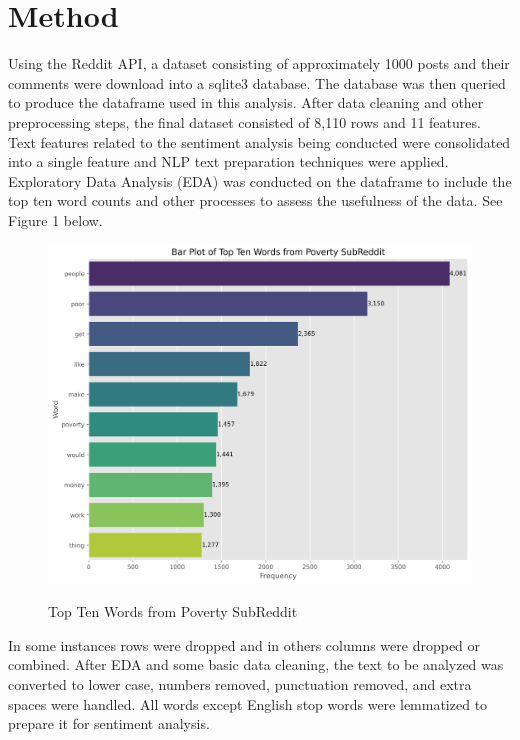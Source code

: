 \documentclass[stu,12pt,floatsintext]{apa7}
\begin{document}
\section{Method}
\indent Using the Reddit API, a dataset consisting of approximately 1000 posts and their comments were download into a sqlite3 database.  The database was then queried to produce the dataframe used in this analysis.  After data cleaning and other preprocessing steps, the final dataset consisted of 8,110 rows and 11 features.  Text features related to the sentiment analysis being conducted were consolidated into a single feature and NLP text preparation techniques were applied.  Exploratory Data Analysis (EDA) was conducted on the dataframe to include the top ten word counts and other processes to assess the usefulness of the data.  See Figure 1 below.
\begin{figure}[H]
	\centering
	\caption{Top Ten Words from Poverty SubReddit}
	\includegraphics[width=0.75\linewidth]{figures/barplotWordCount.png}
	\label{fig:word_counts}
\end{figure}
\indent In some instances rows were dropped and in others columns were dropped or combined.  After EDA and some basic data cleaning, the text to be analyzed  was converted to lower case, numbers removed, punctuation removed, and extra spaces were handled.  All words except English stop words were lemmatized to prepare it for sentiment analysis. 
\end{document}
